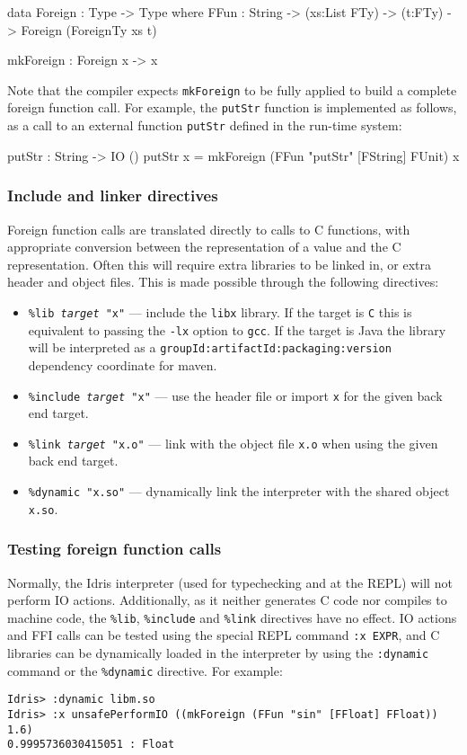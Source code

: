 \begin{code}
data Foreign : Type -> Type where
    FFun : String -> (xs:List FTy) -> (t:FTy) -> 
           Foreign (ForeignTy xs t)

mkForeign : Foreign x -> x
\end{code}

\noindent
Note that the compiler expects \texttt{mkForeign} to be fully applied to
build a complete foreign function call.
For example, the \texttt{putStr} function is implemented as follows, as a call to  an external function \texttt{putStr} defined in the run-time system:

\begin{code}
putStr : String -> IO ()
putStr x = mkForeign (FFun "putStr" [FString] FUnit) x
\end{code}

\subsubsection*{Include and linker directives}

Foreign function calls are translated directly to calls to C functions, with appropriate conversion between the \Idris{} representation of a value and the C representation.
Often this will require extra libraries to be linked in, or extra header and object files.
This is made possible through the following directives:

\begin{itemize}
\item \texttt{\%lib \emph{target} "x"} --- include the \texttt{libx} library.
If the target is \texttt{C} this is equivalent to passing the \texttt{-lx} option to \texttt{gcc}.
If the target is Java the library will be interpreted as a \texttt{groupId\-:artifactId\-:packaging:version} dependency coordinate for maven.
\item \texttt{\%include \emph{target} "x"} --- use the header file or import \texttt{x} for the given back end target.
\item \texttt{\%link \emph{target} "x.o"} --- link with the object file \texttt{x.o} when using the given back end target.
\item \texttt{\%dynamic "x.so"} --- dynamically link the interpreter with the shared object \texttt{x.so}.
\end{itemize}

\subsubsection*{Testing foreign function calls}
Normally, the Idris interpreter (used for typechecking and at the REPL) will not perform IO actions.
Additionally, as it neither generates C code nor compiles to machine code, the \texttt{\%lib}, \texttt{\%include} and \texttt{\%link} directives have no effect.
IO actions and FFI calls can be tested using the special REPL command \texttt{:x EXPR}, and C libraries can be dynamically loaded in the interpreter by using the \texttt{:dynamic} command or the \texttt{\%dynamic} directive.
For example:

\begin{lstlisting}[style=stdout]
Idris> :dynamic libm.so
Idris> :x unsafePerformIO ((mkForeign (FFun "sin" [FFloat] FFloat)) 1.6)
0.9995736030415051 : Float
\end{lstlisting}

